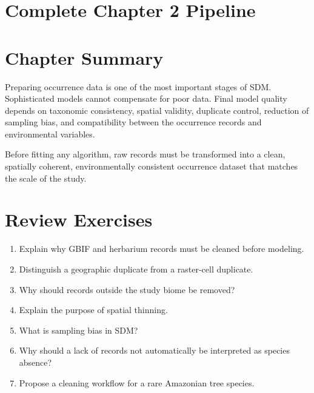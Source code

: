 \section{Complete Chapter 2 Pipeline}


\section{Chapter Summary}

Preparing occurrence data is one of the most important stages of SDM.
Sophisticated models cannot compensate for poor data. Final model quality
depends on taxonomic consistency, spatial validity, duplicate control,
reduction of sampling bias, and compatibility between the occurrence records
and environmental variables.

\begin{conceito}[title={\faBook\quad Key message}]
Before fitting any algorithm, raw records must be transformed into a clean,
spatially coherent, environmentally consistent occurrence dataset that matches
the scale of the study.
\end{conceito}

\section{Review Exercises}

\begin{enumerate}
  \item Explain why GBIF and herbarium records must be cleaned before modeling.
  \item Distinguish a geographic duplicate from a raster-cell duplicate.
  \item Why should records outside the study biome be removed?
  \item Explain the purpose of spatial thinning.
  \item What is sampling bias in SDM?
  \item Why should a lack of records not automatically be interpreted as species absence?
  \item Propose a cleaning workflow for a rare Amazonian tree species.
\end{enumerate}
